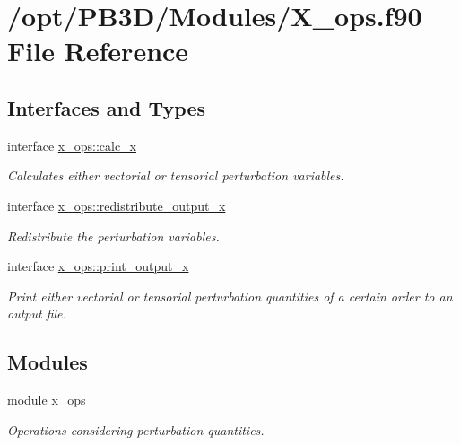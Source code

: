 \hypertarget{X__ops_8f90}{}\section{/opt/\+P\+B3\+D/\+Modules/\+X\+\_\+ops.f90 File Reference}
\label{X__ops_8f90}
\subsection*{Interfaces and Types}
\begin{DoxyCompactItemize}
\item 
interface \hyperlink{interfacex__ops_1_1calc__x}{x\+\_\+ops\+::calc\+\_\+x}
\begin{DoxyCompactList}\small\item\em Calculates either vectorial or tensorial perturbation variables. \end{DoxyCompactList}\item 
interface \hyperlink{interfacex__ops_1_1redistribute__output__x}{x\+\_\+ops\+::redistribute\+\_\+output\+\_\+x}
\begin{DoxyCompactList}\small\item\em Redistribute the perturbation variables. \end{DoxyCompactList}\item 
interface \hyperlink{interfacex__ops_1_1print__output__x}{x\+\_\+ops\+::print\+\_\+output\+\_\+x}
\begin{DoxyCompactList}\small\item\em Print either vectorial or tensorial perturbation quantities of a certain order to an output file. \end{DoxyCompactList}\end{DoxyCompactItemize}
\subsection*{Modules}
\begin{DoxyCompactItemize}
\item 
module \hyperlink{namespacex__ops}{x\+\_\+ops}
\begin{DoxyCompactList}\small\item\em Operations considering perturbation quantities. \end{DoxyCompactList}\end{DoxyCompactItemize}
